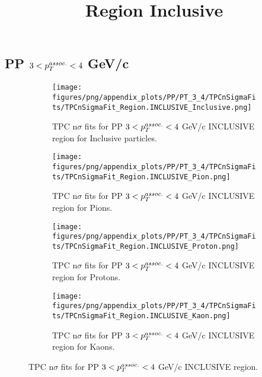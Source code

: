     
            \subsection{PP $3 < \pTassoc < 4$ GeV/c}
            \begin{figure}[H]
                \title{Region Inclusive}
                \begin{subfigure}[b]{0.5\textwidth}
                    \centering
                    \texttt{[image: figures/png/appendix\_plots/PP/PT\_3\_4/TPCnSigmaFits/TPCnSigmaFit\_Region.INCLUSIVE\_Inclusive.png]}
                    \caption{TPC n$\sigma$ fits for PP $3 < \pTassoc < 4$ GeV/c INCLUSIVE region for Inclusive particles.}
                    \label{fig:appendix_PP_$3 < \pTassoc < 4$ GeV/c_INCLUSIVE_Inclusive}
                \end{subfigure}
                \begin{subfigure}[b]{0.5\textwidth}
                    \centering
                    \texttt{[image: figures/png/appendix\_plots/PP/PT\_3\_4/TPCnSigmaFits/TPCnSigmaFit\_Region.INCLUSIVE\_Pion.png]}
                    \caption{TPC n$\sigma$ fits for PP $3 < \pTassoc < 4$ GeV/c INCLUSIVE region for Pions.}
                    \label{fig:appendix_PP_$3 < \pTassoc < 4$ GeV/c_INCLUSIVE_Pion}
                \end{subfigure}
                \begin{subfigure}[b]{0.5\textwidth}
                    \centering
                    \texttt{[image: figures/png/appendix\_plots/PP/PT\_3\_4/TPCnSigmaFits/TPCnSigmaFit\_Region.INCLUSIVE\_Proton.png]}
                    \caption{TPC n$\sigma$ fits for PP $3 < \pTassoc < 4$ GeV/c INCLUSIVE region for Protons.}
                    \label{fig:appendix_PP_$3 < \pTassoc < 4$ GeV/c_INCLUSIVE_Proton}
                \end{subfigure}
                \begin{subfigure}[b]{0.5\textwidth}
                    \centering
                    \texttt{[image: figures/png/appendix\_plots/PP/PT\_3\_4/TPCnSigmaFits/TPCnSigmaFit\_Region.INCLUSIVE\_Kaon.png]}
                    \caption{TPC n$\sigma$ fits for PP $3 < \pTassoc < 4$ GeV/c INCLUSIVE region for Kaons.}
                    \label{fig:appendix_PP_$3 < \pTassoc < 4$ GeV/c_INCLUSIVE_Kaon}
                \end{subfigure}
                \caption{TPC n$\sigma$ fits for PP $3 < \pTassoc < 4$ GeV/c INCLUSIVE region.}
                \label{fig:appendix_PP_$3 < \pTassoc < 4$ GeV/c_INCLUSIVE}
            \end{figure}
